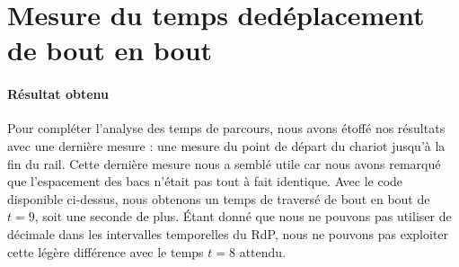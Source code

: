 \section{Mesure du temps dedéplacement de bout en bout}\label{Annex:MesuresXY-boutEnBout}
	\paragraph*{Résultat obtenu}
	Pour compléter l'analyse des temps de parcours, nous avons étoffé nos résultats avec une dernière mesure : une mesure du point de départ du chariot jusqu'à la fin du rail.  Cette dernière mesure nous a semblé utile car nous avons remarqué que l'espacement des bacs n'était pas tout à fait identique. Avec le code disponible ci-dessus, nous obtenons un temps de traversé de bout en bout de $t = 9$, soit une seconde de plus. Étant donné que nous ne pouvons pas utiliser de décimale dans les intervalles temporelles du RdP, nous ne pouvons pas exploiter cette légère différence avec le temps $t=8$ attendu.